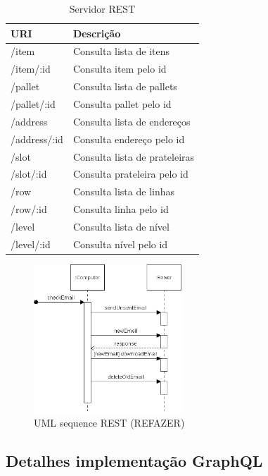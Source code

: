 \begin{table}[htbp]
    \centering
    \begin{tabular}{| l | l |}
        \hline
        \textbf{URI} & \textbf{Descrição} \\ \hline
        /item & Consulta lista de itens \\ \hline
        /item/:id & Consulta item pelo id \\ \hline
        /pallet & Consulta lista de pallets  \\ \hline
        /pallet/:id & Consulta pallet pelo id  \\ \hline
        /address & Consulta lista de endereços \\ \hline
        /address/:id & Consulta endereço pelo id \\ \hline
        /slot & Consulta lista de prateleiras \\ \hline
        /slot/:id & Consulta prateleira pelo id \\ \hline
        /row & Consulta lista de linhas \\ \hline
        /row/:id & Consulta linha pelo id \\ \hline
        /level & Consulta lista de nível \\ \hline
        /level/:id & Consulta nível pelo id \\ \hline
    \end{tabular}
    \caption{Servidor REST} \label{tab:rest-url}
\end{table}

\begin{figure}[htbp]
\centering
\includegraphics[width=0.5\textwidth]{figuras/uml-sequence.png}
\caption{UML sequence REST (REFAZER)}
\label{fig:rest-uml}
\author{fonte: Autor}
\end{figure}

\subsection{Detalhes implementação GraphQL}

